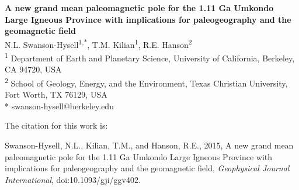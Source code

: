 \documentclass[11pt,letterpaper]{article}
\date{}
\begin{document}
\begin{flushleft}
{\Large \textbf{A new grand mean paleomagnetic pole for the 1.11 Ga Umkondo Large Igneous Province with implications for paleogeography and the geomagnetic field}}
\\
N.L. Swanson-Hysell\textsuperscript{1,*},
T.M. Kilian\textsuperscript{1},
R.E. Hanson\textsuperscript{2}
\\
\bigskip
\textsuperscript{1} Department of Earth and Planetary Science, University of California, Berkeley, CA 94720, USA
\\
\textsuperscript{2} School of Geology, Energy, and the Environment, Texas Christian University, Fort Worth, TX 76129, USA
\\
\bigskip
* swanson-hysell@berkeley.edu

The citation for this work is:

Swanson-Hysell, N.L., Kilian, T.M., and Hanson, R.E., 2015, A new grand mean paleomagnetic pole for the 1.11 Ga Umkondo Large Igneous Province with implications for paleogeography and the geomagnetic field, \textit{Geophysical Journal International}, doi:10.1093/gji/ggv402.

\end{flushleft}

\linenumbers
\end{document}
